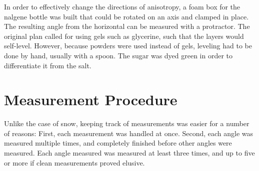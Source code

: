 In order to effectively change the directions of anisotropy, a foam box for the
nalgene bottle was built that could be rotated on an axis and clamped in place.
The resulting angle from the horizontal can be measured with a protractor. The
original plan called for using gels such as glycerine, such that the layers
would self-level. However, because powders were used instead of gels, leveling
had to be done by hand, usually with a spoon. The sugar was dyed green in order
 to differentiate it from the salt.

\section{Measurement Procedure}

Unlike the case of snow, keeping track of measurements was easier for a number
of reasons: First, each measurement was handled at once. Second, each angle
was measured multiple times, and completely finished before other angles were
measured. Each angle measured was measured at least three times, and up to five
or more if clean measurements proved elusive.

